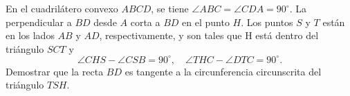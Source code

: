En el cuadrilátero convexo $ABCD$, se tiene $\angle ABC = \angle CDA = 90^{\circ}$. La perpendicular a $BD$ desde $A$ corta a $BD$ en el punto $H$. Los puntos $S$ y $T$ están en los lados $AB$ y $AD$, respectivamente, y son tales que H está dentro del triángulo $SCT$ y
\[\angle CHS -\angle CSB = 90^{\circ}, \quad \angle THC -\angle DTC = 90^{\circ} .\]
Demostrar que la recta $BD$ es tangente a la circunferencia circunscrita del triángulo $TSH$.
